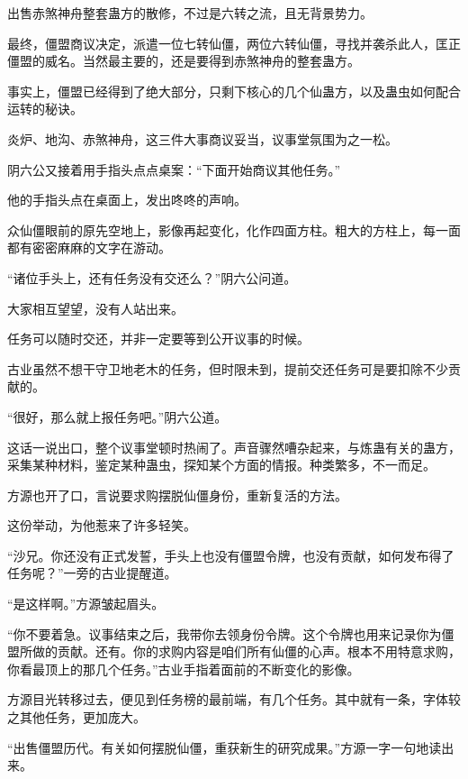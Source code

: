 
\begin{this_body}



出售赤煞神舟整套蛊方的散修，不过是六转之流，且无背景势力。

最终，僵盟商议决定，派遣一位七转仙僵，两位六转仙僵，寻找并袭杀此人，匡正僵盟的威名。当然最主要的，还是要得到赤煞神舟的整套蛊方。

事实上，僵盟已经得到了绝大部分，只剩下核心的几个仙蛊方，以及蛊虫如何配合运转的秘诀。

炎炉、地沟、赤煞神舟，这三件大事商议妥当，议事堂氛围为之一松。

阴六公又接着用手指头点点桌案：“下面开始商议其他任务。”

他的手指头点在桌面上，发出咚咚的声响。

众仙僵眼前的原先空地上，影像再起变化，化作四面方柱。粗大的方柱上，每一面都有密密麻麻的文字在游动。

“诸位手头上，还有任务没有交还么？”阴六公问道。

大家相互望望，没有人站出来。

任务可以随时交还，并非一定要等到公开议事的时候。

古业虽然不想干守卫地老木的任务，但时限未到，提前交还任务可是要扣除不少贡献的。

“很好，那么就上报任务吧。”阴六公道。

这话一说出口，整个议事堂顿时热闹了。声音骤然嘈杂起来，与炼蛊有关的蛊方，采集某种材料，鉴定某种蛊虫，探知某个方面的情报。种类繁多，不一而足。

方源也开了口，言说要求购摆脱仙僵身份，重新复活的方法。

这份举动，为他惹来了许多轻笑。

“沙兄。你还没有正式发誓，手头上也没有僵盟令牌，也没有贡献，如何发布得了任务呢？”一旁的古业提醒道。

“是这样啊。”方源皱起眉头。

“你不要着急。议事结束之后，我带你去领身份令牌。这个令牌也用来记录你为僵盟所做的贡献。还有。你的求购内容是咱们所有仙僵的心声。根本不用特意求购，你看最顶上的那几个任务。”古业手指着面前的不断变化的影像。

方源目光转移过去，便见到任务榜的最前端，有几个任务。其中就有一条，字体较之其他任务，更加庞大。

“出售僵盟历代。有关如何摆脱仙僵，重获新生的研究成果。”方源一字一句地读出来。


\end{this_body}
